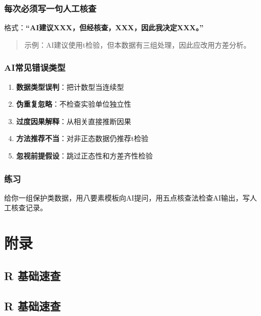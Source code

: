 \documentclass[
  letterpaper,
]{scrbook}
\providecommand{\tightlist}{%
  \setlength{\itemsep}{0pt}\setlength{\parskip}{0pt}}
\begin{document}
\section{每次必须写一句人工核查}\label{ux6bcfux6b21ux5fc5ux987bux5199ux4e00ux53e5ux4ebaux5de5ux6838ux67e5}

格式：\textbf{``AI建议XXX，但经核查，XXX，因此我决定XXX。''}

\begin{quote}
示例：AI建议使用t检验，但本数据有三组处理，因此应改用方差分析。
\end{quote}

\section{AI常见错误类型}\label{aiux5e38ux89c1ux9519ux8befux7c7bux578b}

\begin{enumerate}
\def\labelenumi{\arabic{enumi}.}
\tightlist
\item
  \textbf{数据类型误判}：把计数型当连续型
\item
  \textbf{伪重复忽略}：不检查实验单位独立性
\item
  \textbf{过度因果解释}：从相关直接推断因果
\item
  \textbf{方法推荐不当}：对非正态数据仍推荐t检验
\item
  \textbf{忽视前提假设}：跳过正态性和方差齐性检验
\end{enumerate}

\section{练习}\label{ux7ec3ux4e60-21}

给你一组保护类数据，用八要素模板向AI提问，用五点核查法检查AI输出，写人工核查记录。

\part{附录}

\chapter{R 基础速查}\label{r-ux57faux7840ux901fux67e5}

\chapter{R 基础速查}\label{r-ux57faux7840ux901fux67e5-1}
\end{document}
